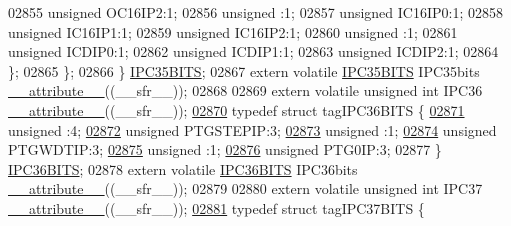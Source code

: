 \begin{DoxyCode}
02855       \textcolor{keywordtype}{unsigned} OC16IP2:1;
02856       \textcolor{keywordtype}{unsigned} :1;
02857       \textcolor{keywordtype}{unsigned} IC16IP0:1;
02858       \textcolor{keywordtype}{unsigned} IC16IP1:1;
02859       \textcolor{keywordtype}{unsigned} IC16IP2:1;
02860       \textcolor{keywordtype}{unsigned} :1;
02861       \textcolor{keywordtype}{unsigned} ICDIP0:1;
02862       \textcolor{keywordtype}{unsigned} ICDIP1:1;
02863       \textcolor{keywordtype}{unsigned} ICDIP2:1;
02864     \};
02865   \};
02866 \} \hyperlink{a00008_dd/d72/a00541}{IPC35BITS};
02867 \textcolor{keyword}{extern} \textcolor{keyword}{volatile} \hyperlink{a00008_dd/d72/a00541}{IPC35BITS} IPC35bits \hyperlink{a00009_a493c46f03454991ccc5aa7a6e1dfb2a7}{\_\_attribute\_\_}((\_\_sfr\_\_));
02868 
02869 \textcolor{keyword}{extern} \textcolor{keyword}{volatile} \textcolor{keywordtype}{unsigned} \textcolor{keywordtype}{int}  IPC36 \hyperlink{a00009_a493c46f03454991ccc5aa7a6e1dfb2a7}{\_\_attribute\_\_}((\_\_sfr\_\_));
\hypertarget{a00009_source_l02870}{}\hyperlink{a00008}{02870} \textcolor{keyword}{typedef} \textcolor{keyword}{struct }tagIPC36BITS \{
\hypertarget{a00009_source_l02871}{}\hyperlink{a00008_adf71f3d8410c1f1dbbc96680a92c49af}{02871}   \textcolor{keywordtype}{unsigned} :4;
\hypertarget{a00009_source_l02872}{}\hyperlink{a00008_a9d3fa792c6cf33d5a01c6685e328b633}{02872}   \textcolor{keywordtype}{unsigned} PTGSTEPIP:3;
\hypertarget{a00009_source_l02873}{}\hyperlink{a00008_acaf2d0924a107ec6e8d2e31febaf66f9}{02873}   \textcolor{keywordtype}{unsigned} :1;
\hypertarget{a00009_source_l02874}{}\hyperlink{a00008_a54e9e5a9bb9183401b4d4314b91171b9}{02874}   \textcolor{keywordtype}{unsigned} PTGWDTIP:3;
\hypertarget{a00009_source_l02875}{}\hyperlink{a00008_a4d97cc5f7d51d22fc2bf3eab35c9cb7f}{02875}   \textcolor{keywordtype}{unsigned} :1;
\hypertarget{a00009_source_l02876}{}\hyperlink{a00008_a41d07d63e8f94ad7273e13762100efd7}{02876}   \textcolor{keywordtype}{unsigned} PTG0IP:3;
02877 \} \hyperlink{a00008_d2/ddf/a00544}{IPC36BITS};
02878 \textcolor{keyword}{extern} \textcolor{keyword}{volatile} \hyperlink{a00008_d2/ddf/a00544}{IPC36BITS} IPC36bits \hyperlink{a00009_a493c46f03454991ccc5aa7a6e1dfb2a7}{\_\_attribute\_\_}((\_\_sfr\_\_));
02879 
02880 \textcolor{keyword}{extern} \textcolor{keyword}{volatile} \textcolor{keywordtype}{unsigned} \textcolor{keywordtype}{int}  IPC37 \hyperlink{a00009_a493c46f03454991ccc5aa7a6e1dfb2a7}{\_\_attribute\_\_}((\_\_sfr\_\_));
\hypertarget{a00009_source_l02881}{}\hyperlink{a00008}{02881} \textcolor{keyword}{typedef} \textcolor{keyword}{struct }tagIPC37BITS \{

\end{DoxyCode}
